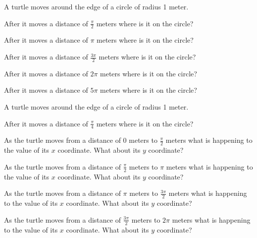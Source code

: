 \begin{problem}
  \item A turtle moves around the edge of a circle of radius 1 meter.
    \begin{subproblem}
      \item After it moves a distance of $\frac{\pi}{2}$ meters where is it on the circle?
      \vfill
      \item After it moves a distance of $\pi$ meters where is it on the circle?
      \vfill
      \item After it moves a distance of $\frac{3\pi}{2}$ meters where is it on the circle?
      \vfill
      \item After it moves a distance of $2\pi$ meters where is it on the circle?
      \vfill
      \item After it moves a distance of $5\pi$ meters where is it on the circle?
      \vfill
    \end{subproblem}

\clearpage

\item A turtle moves around the edge of a circle of radius 1 meter.
  \begin{subproblem}
    \item After it moves a distance of $\frac{\pi}{4}$ meters where is it on the circle?
    \vfill
    \item As the turtle moves from a distance of 0 meters to $\frac{\pi}{2}$ meters
      what is happening to the value of its $x$ coordinate. What about its $y$ coordinate?
    \vfill
    \item As the turtle moves from a distance of $\frac{\pi}{2}$ meters to $\pi$ meters
      what is happening to the value of its $x$ coordinate. What about its $y$ coordinate?
    \vfill
    \item As the turtle moves from a distance of $\pi$ meters to $\frac{3\pi}{2}$ meters
      what is happening to the value of its $x$ coordinate. What about its $y$ coordinate?
    \vfill
    \item As the turtle moves from a distance of $\frac{3\pi}{2}$ meters to $2\pi$ meters
      what is happening to the value of its $x$ coordinate. What about its $y$ coordinate?
    \vfill
  \end{subproblem}


\end{problem}
